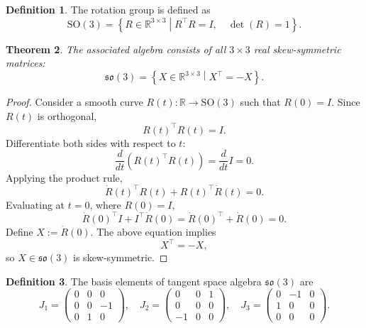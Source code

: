 \documentclass{amsart}
\newtheorem{theorem}{Theorem}[section]
\theoremstyle{definition}
\newtheorem{definition}[theorem]{Definition}
\theoremstyle{remark}
\begin{document}
\begin{definition}
  The rotation group is defined as
  \begin{equation*}
    \mathrm{SO}(3) = \left\{ R \in \mathbb{R}^{3 \times 3} \middle|
    R^\top R = I, \quad \det(R) = 1 \right\}.
  \end{equation*}
\end{definition}

\begin{theorem}\label{thm:so3_algebra_skew_symmetric}
  The associated algebra consists of all $3 \times 3$ real skew-symmetric matrices:
  \begin{equation*}
    \mathfrak{so}(3) = \left\{ X \in \mathbb{R}^{3 \times 3} \middle|
    X^\top = -X \right\}.
  \end{equation*}
\end{theorem}

\begin{proof}
  Consider a smooth curve $R(t): \mathbb{R} \to \mathrm{SO}(3)$ such that $R(0) = I$. Since $R(t)$ is orthogonal,
  \begin{equation*}
    R(t)^\top R(t) = I.
  \end{equation*}
  Differentiate both sides with respect to $t$:
  \begin{equation*}
    \frac{d}{dt} \left( R(t)^\top R(t) \right) = \frac{d}{dt} I = 0.
  \end{equation*}
  Applying the product rule,
  \begin{equation*}
    \dot{R}(t)^\top R(t) + R(t)^\top \dot{R}(t) = 0.
  \end{equation*}
  Evaluating at $t=0$, where $R(0) = I$,
  \begin{equation*}
    \dot{R}(0)^\top I + I^\top \dot{R}(0) = \dot{R}(0)^\top + \dot{R}(0) = 0.
  \end{equation*}
  Define $X := \dot{R}(0)$. The above equation implies
  \begin{equation*}
    X^\top = -X,
  \end{equation*}
  so $X \in \mathfrak{so}(3)$ is skew-symmetric.
\end{proof}

\begin{definition}
  The basis elements of tangent space algebra $\mathfrak{so}(3)$ are
  \begin{equation*}
    J_1 =
    \begin{pmatrix}
      0 & 0 & 0 \\
      0 & 0 & -1 \\
      0 & 1 & 0
    \end{pmatrix}, \quad
    J_2 =
    \begin{pmatrix}
      0 & 0 & 1 \\
      0 & 0 & 0 \\
      -1 & 0 & 0
    \end{pmatrix}, \quad
    J_3 =
    \begin{pmatrix}
      0 & -1 & 0 \\
      1 & 0 & 0 \\
      0 & 0 & 0
    \end{pmatrix}.
  \end{equation*}
\end{definition}
\end{document}
